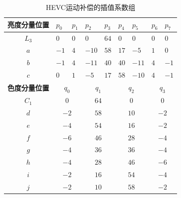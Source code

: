\begin{table}[!tp]
	\begin{center}
		\caption{HEVC运动补偿的插值系数组} \label{table:coeff_position}
		\renewcommand{\arraystretch}{1.3}
		\begin{tabular}{c|p{1cm}|p{1cm}|p{1cm}|p{1cm}|p{1cm}|p{1cm}|p{1cm}|p{1cm}}
			\hline
			\textbf{亮度分量位置} & \textbf{$p_0$} & \textbf{$p_1$} & \textbf{$p_2$} & \textbf{$p_3$} & \textbf{$p_4$} & \textbf{$p_5$} & \textbf{$p_6$} & \textbf{$p_7$} \\
			\hline
			\hline
			$L_3$ & $0$ & $0$ & $0$ & $64$ & $0$ & $0$ & $0$ & $0$ \\
			\hline
			$a$ & $-1$ & $4$ & $-10$ & $58$ & $17$ & $-5$ & $1$ & $0$ \\
			\hline
			$b$ & $-1$ & $4$ & $-11$ & $40$ & $40$ & $-11$ & $4$ & $-1$ \\
			\hline
			$c$ & $0$ & $1$ & $-5$ & $17$ & $58$ & $-10$ & $4$ & $-1$ \\
			\hline
			\hline
			\textbf{色度分量位置} & \multicolumn{2}{|c|}{\textbf{$q_0$}} & \multicolumn{2}{c}{\textbf{$q_1$}} & \multicolumn{2}{|c|}{\textbf{$q_2$}} & \multicolumn{2}{c}{\textbf{$q_3$}} \\
			\hline
			\hline
			$C_1$ & \multicolumn{2}{|c|}{\textbf{$0$}} & \multicolumn{2}{c}{\textbf{$64$}} & \multicolumn{2}{|c|}{\textbf{$0$}} & \multicolumn{2}{c}{\textbf{$0$}} \\
			\hline
			$d$ & \multicolumn{2}{|c|}{\textbf{$-2$}} & \multicolumn{2}{c}{\textbf{$58$}} & \multicolumn{2}{|c|}{\textbf{$10$}} & \multicolumn{2}{c}{\textbf{$-2$}} \\
			\hline
			$e$ & \multicolumn{2}{|c|}{\textbf{$-4$}} & \multicolumn{2}{c}{\textbf{$54$}} & \multicolumn{2}{|c|}{\textbf{$16$}} & \multicolumn{2}{c}{\textbf{$-2$}} \\
			\hline
			$f$ & \multicolumn{2}{|c|}{\textbf{$-6$}} & \multicolumn{2}{c}{\textbf{$46$}} & \multicolumn{2}{|c|}{\textbf{$28$}} & \multicolumn{2}{c}{\textbf{$-4$}} \\
			\hline
			$g$ & \multicolumn{2}{|c|}{\textbf{$-4$}} & \multicolumn{2}{c}{\textbf{$36$}} & \multicolumn{2}{|c|}{\textbf{$36$}} & \multicolumn{2}{c}{\textbf{$-4$}} \\
			\hline
			$h$ & \multicolumn{2}{|c|}{\textbf{$-4$}} & \multicolumn{2}{c}{\textbf{$28$}} & \multicolumn{2}{|c|}{\textbf{$46$}} & \multicolumn{2}{c}{\textbf{$-6$}} \\
			\hline
			$i$ & \multicolumn{2}{|c|}{\textbf{$-2$}} & \multicolumn{2}{c}{\textbf{$16$}} & \multicolumn{2}{|c|}{\textbf{$54$}} & \multicolumn{2}{c}{\textbf{$-4$}} \\
			\hline
			$j$ & \multicolumn{2}{|c|}{\textbf{$-2$}} & \multicolumn{2}{c}{\textbf{$10$}} & \multicolumn{2}{|c|}{\textbf{$58$}} & \multicolumn{2}{c}{\textbf{$-2$}} \\
			\hline
		\end{tabular}
	\end{center}
\end{table}

